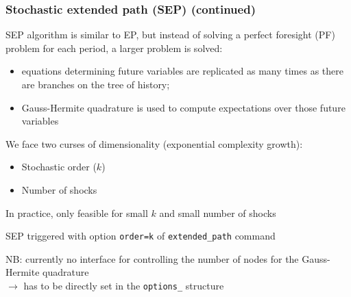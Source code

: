 \documentclass[handout,usepdftitle=false,xcolor=dvipsnames,aspectratio=169]{beamer}
\begin{document}
\begin{frame}
  \frametitle{Stochastic extended path (SEP) (continued)}
  \begin{witemize}
    \item SEP algorithm is similar to EP, but instead of solving
    a perfect foresight (PF) problem for each period, a larger problem is
    solved:
    \begin{itemize}
      \item equations determining future variables are replicated as many
            times as there are branches on the tree of history;
      \item Gauss-Hermite quadrature is used to compute expectations over those future variables
    \end{itemize}
    \item We face two curses of dimensionality (exponential complexity growth):
    \begin{itemize}
      \item Stochastic order ($k$)
      \item Number of shocks
    \end{itemize}
    \item In practice, only feasible for small $k$ and small number of shocks
    \item SEP triggered with option \texttt{order=k} of \texttt{extended\_path}
    command
    \item NB: currently no interface for controlling the number of nodes for the
    Gauss-Hermite quadrature\\
    $\rightarrow$ has to be directly set in the
    \texttt{options\_} structure
  \end{witemize}
\end{frame}
\end{document}
